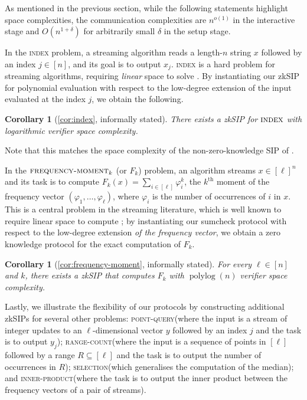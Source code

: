 \documentclass[a4paper,UKenglish,cleveref, autoref, thm-restate]{lipics-v2021}
\newtheorem{corollary}[theorem]{Corollary}
\theoremstyle{definition}
\newcommand{\zksip}{\textrm{zkSIP}}
\newcommand{\polylog}{\operatorname{polylog}}
\newcommand{\indexproblem}{\normalfont\textsc{index}\xspace}
\newcommand{\frequencymoment}{\normalfont\textsc{frequency-moment}\xspace}
\newcommand{\pointquery}{\normalfont\textsc{point-query}\xspace}
\newcommand{\rangecount}{\normalfont\textsc{range-count}\xspace}
\newcommand{\selection}{\normalfont\textsc{selection}\xspace}
\newcommand{\innerproductproblem}{\normalfont\textsc{inner-product}\xspace}
\begin{document}
As mentioned in the previous section, while the following statements highlight space complexities, the communication complexities are $n^{o(1)}$ in the interactive stage and $O(n^{1 + \delta})$ for arbitrarily small $\delta$ in the setup stage.

In the \indexproblem problem, a streaming algorithm reads a length-$n$ string $x$ followed by an index $j \in [n]$, and its goal is to output $x_j$. \indexproblem is a hard problem for streaming algorithms, requiring \emph{linear} space to solve \cite{RY20}. By instantiating our \zksip{} for polynomial evaluation with respect to the low-degree extension of the input evaluated at the index $j$, we obtain the following.

\begin{corollary}[\cref{cor:index}, informally stated]
    \label{infcor:index}
    There exists a \zksip{} for $\indexproblem$ with logarithmic verifier space complexity.
\end{corollary}
\noindent Note that this matches the space complexity of the non-zero-knowledge SIP of \cite{CCMTV15, CCMTV19}.

In the $\frequencymoment_k$ (or $F_k$) problem, an algorithm streams $x \in [\ell]^n$ and its task is to compute $F_k(x) = \sum_{i \in [\ell]} \varphi_i^k$, the $k^\text{th}$ moment of the frequency vector $(\varphi_1,\ldots,\varphi_\ell)$, where $\varphi_i$ is the number of occurrences of $i$ in $x$. This is a central problem in the streaming literature, which is well known to require linear space to compute \cite{AMS99}; by instantiating our sumcheck protocol with respect to the low-degree extension \emph{of the frequency vector}, we obtain a zero knowledge protocol for the exact computation of $F_k$.

\begin{corollary}[\cref{cor:frequency-moment}, informally stated]
    \label{infcor:frequency-moment}
    For every $\ell \in [n]$ and $k$, there exists a \zksip{} that computes $F_k$ with $\polylog(n)$ verifier space complexity.
\end{corollary}

Lastly, we illustrate the flexibility of our protocols by constructing additional \zksip{}s for several other problems: \pointquery (where the input is a stream of integer updates to an $\ell$-dimensional vector $y$ followed by an index $j$ and the task is to output $y_j$); \rangecount (where the input is a sequence of points in $[\ell]$ followed by a range $R \subseteq [\ell]$ and the task is to output the number of occurrences in $R$); \selection (which generalises the computation of the median); and \innerproductproblem (where the task is to output the inner product between the frequency vectors of a pair of streams).
\end{document}
